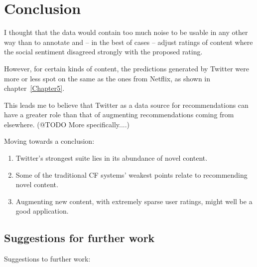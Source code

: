 
\chapter{Conclusion} %

\label{Chapter6}




I thought that the data would contain too much noise to be usable in any other way than to annotate and -- in the best of cases -- adjust ratings of content where the social sentiment disagreed strongly with the proposed rating.

However, for certain kinds of content, the predictions generated by Twitter were more or less spot on the same as the ones from Netflix, as shown in chapter~\ref{Chapter5}.

This leads me to believe that Twitter as a data source for recommendations can have a greater role than that of augmenting recommendations coming from elsewhere. (@TODO More specifically....)

Moving towards a conclusion:

\begin{enumerate}
  \item Twitter's strongest suite lies in its abundance of novel content.
  \item Some of the traditional CF systems' weakest points relate to recommending novel content.
  \item Augmenting new content, with extremely sparse user ratings, might well be a good application.
\end{enumerate}

\section{Suggestions for further work} %
\label{sec:suggestions_for_further_work}

Suggestions to further work:

